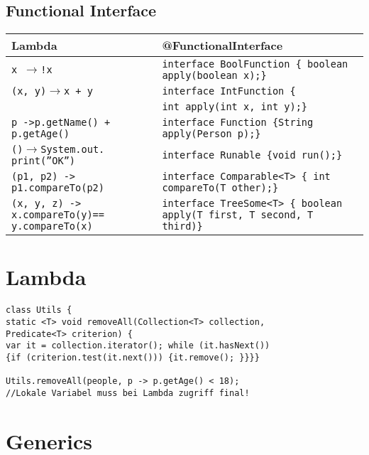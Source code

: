 \begin{multicols*}{5}
	\subsection{Functional Interface}


		\begin{tabular}{|p{1.6cm} p{3.1cm}|}
			\hline
			Lambda & @FunctionalInterface\\
			\hline
			\hline
			\tiny \texttt{x $\rightarrow$!x }&\tiny \texttt{interface BoolFunction \{ boolean apply(boolean x);\}}\\
			\hline
			\tiny \texttt{(x, y)$\rightarrow$x + y}&\tiny \texttt{interface IntFunction \{}\\
			&\tiny \texttt{int apply(int x, int y);\}}\\
			\hline
			\tiny \texttt{p ->p.getName() + p.getAge()}& \tiny \texttt{interface Function \{String apply(Person p);\}}\\
			\hline
			\tiny \texttt{()$\rightarrow$System.out. print(''OK'')}&\tiny \texttt{interface Runable \{void run();\}}\\
			\hline
			\tiny \texttt{(p1, p2) -> p1.compareTo(p2)}&\tiny \texttt{interface Comparable<T> \{ int compareTo(T other);\}}\\
			\hline
			\tiny \texttt{(x, y, z) -> x.compareTo(y)== y.compareTo(x)}&\tiny \texttt{interface TreeSome<T> \{ boolean apply(T first, T second, T third)\}}\\
			\hline
		\end{tabular}








\section{Lambda}

	\begin{lstlisting}
class Utils {
static <T> void removeAll(Collection<T> collection,
Predicate<T> criterion) {
var it = collection.iterator(); while (it.hasNext()) 
{if (criterion.test(it.next())) {it.remove(); }}}}
	
Utils.removeAll(people, p -> p.getAge() < 18); 
//Lokale Variabel muss bei Lambda zugriff final!
	\end{lstlisting}








\section{Generics}


\end{multicols*}
